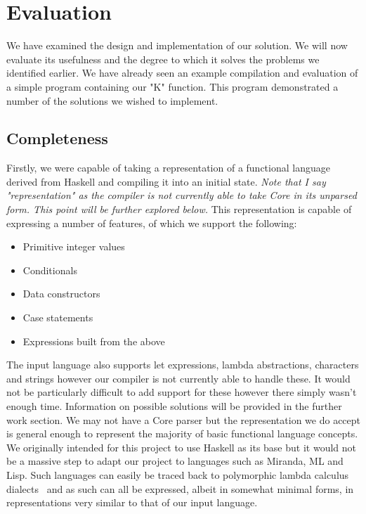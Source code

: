 \section{Evaluation}
We have examined the design and implementation of our solution.
We will now evaluate its usefulness and the degree to which it
solves the problems we identified earlier. We have already seen
an example compilation and evaluation of a simple program containing
our "K" function. This program demonstrated a number of the solutions
we wished to implement.

\subsection{Completeness}
Firstly, we were capable of taking a representation of a functional
language derived from Haskell and compiling it into an initial state.
\emph{ Note that I say "representation" as the compiler is not 
currently able to take Core in its unparsed form. This point will be
further explored below.} This representation is capable of expressing
a number of features, of which we support the following:

\begin{itemize}
	\item Primitive integer values
	\item Conditionals
	\item Data constructors
	\item Case statements
	\item Expressions built from the above
\end{itemize}

\noindent The input language also supports let expressions, lambda
abstractions, characters and strings however our compiler is not
currently able to handle these. It would not be particularly 
difficult to add support for these however there simply wasn't
enough time. Information on possible solutions will be provided
in the further work section. We may not have a Core parser but
the representation we do accept is general enough to represent
the majority of basic functional language concepts. We originally
intended for this project to use Haskell as its base but it would
not be a massive step to adapt our project to languages such as
Miranda, ML and Lisp. Such languages can easily be traced back to
polymorphic lambda calculus dialects~\cite[pp.10]{SystemF} and as such 
can all be expressed, albeit in somewhat minimal forms, in 
representations very similar to that of our input language.

